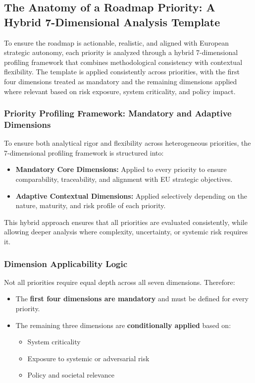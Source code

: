 \documentclass{ieeeaccess}
\begin{document}
\subsection{The Anatomy of a Roadmap Priority: A Hybrid 7-Dimensional Analysis Template}

To ensure the roadmap is actionable, realistic, and aligned with European strategic autonomy, each priority is analyzed through a hybrid 7-dimensional profiling framework that combines methodological consistency with contextual flexibility. The template is applied consistently across priorities, with the first four dimensions treated as mandatory and the remaining dimensions applied where relevant based on risk exposure, system criticality, and policy impact.

\subsubsection*{Priority Profiling Framework: Mandatory and Adaptive Dimensions}
To ensure both analytical rigor and flexibility across heterogeneous priorities, the 7-dimensional profiling framework is structured into:

\begin{itemize}
    \item \textbf{Mandatory Core Dimensions:} Applied to every priority to ensure comparability, traceability, and alignment with EU strategic objectives.
    \item \textbf{Adaptive Contextual Dimensions:} Applied selectively depending on the nature, maturity, and risk profile of each priority.
\end{itemize}

This hybrid approach ensures that all priorities are evaluated consistently, while allowing deeper analysis where complexity, uncertainty, or systemic risk requires it.

\subsubsection*{Dimension Applicability Logic}
Not all priorities require equal depth across all seven dimensions. Therefore:

\begin{itemize}
    \item The \textbf{first four dimensions are mandatory} and must be defined for every priority.
    \item The remaining three dimensions are \textbf{conditionally applied} based on:
    \begin{itemize}
        \item System criticality
        \item Exposure to systemic or adversarial risk
        \item Policy and societal relevance
    \end{itemize}
\end{itemize}
\end{document}

